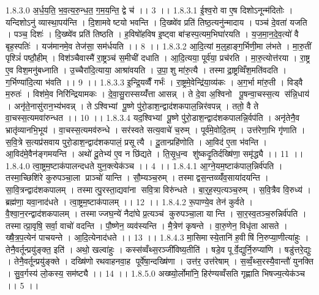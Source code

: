 1.8.3.0
अ॒र्ध॒य॒ति॒ भ॒व॒त्य॒रु॒न्ध॒त॒ ग॒म॒य॒न्ति॒ द्वे च॑ ।। 3 ।।
1.8.3.1
ई॒श्व॒रो वा ए॒ष दिशोऽनून्म॑दितोः । यन्दिशोऽनु॑ व्यास्था॒पय॑न्ति । दि॒शामवेष्टयो भवन्ति । दि॒ख्ष्वे॑व प्रति॑ तिष्ठ॒त्यनु॑न्मादाय । पञ्च॑ दे॒वता॑ यजति । पञ्च॒ दिशः॑ । दि॒ख्ष्वे॑व प्रति॑ तिष्ठति । ह॒विषो॑हविष इ॒ष्ट्वा बा॑ऱ्हस्प॒त्यम॒भिघा॑रयति । य॒ज॒मा॒न॒दे॒व॒त्यो॑ वै बृह॒स्पतिः॑ । यज॑मानमे॒व तेज॑सा॒ सम॑र्धयति ।। 8 ।।
1.8.3.2
आ॒दि॒त्यां म॒ल्॒हाङ्ग॒र्भिणी॒मा ल॑भते । मा॒रु॒तीं पृश्ञिं॑ पष्ठौ॒हीम् । विश॑ञ्चैवास्मै॑ रा॒ष्ट्रञ्च॑ स॒मीची॑ दधाति । आ॒दि॒त्यया॒ पूर्व॑या॒ प्रच॑रति । मा॒रु॒त्योत्त॑रया । रा॒ष्ट्र ए॒व विश॒मनु॑बध्नाति । उ॒च्चैरा॑दि॒त्याया॒ आश्रा॑वयति । उ॒पा॒॒शु मा॑रु॒त्यै । तस्माद्रा॒ष्ट्रव्विँश॒मति॑वदति । ग॒र्भिण्या॑दि॒त्या भ॑वति ।। 9 ।।
1.8.3.3
इ॒न्द्रि॒यव्वैँ गर्भः॑ । रा॒ष्ट्रमे॒वेन्द्रि॑या॒व्य॑कः । अ॒ग॒र्भा मा॑रु॒ती । विड्वै म॒रुतः॑ । विश॑मे॒व निरि॑न्द्रियामकः । दे॒वा॒सु॒रास्सय्यँ॑त्ता आसन्न् । ते दे॒वा अ॒श्विनो पू॒षन्वा॒चस्स॒त्य स॑न्नि॒धाय॑ । अनृ॑ते॒नासु॑रान॒भ्य॑भवन्न् । तेऽश्विभ्यां पू॒ष्णे पु॑रो॒डाश॒न्द्वाद॑शकपाल॒न्निर॑वपन्न् । ततो॒ वै ते वा॒चस्स॒त्यमवा॑रुन्धत ।। 10 ।।
1.8.3.4
यद॒श्विभ्यां पू॒ष्णे पु॑रो॒डाश॒न्द्वाद॑शकपालन्नि॒र्वप॑ति । अनृ॑तेनै॒व भ्रातृ॑व्यानभि॒भूय॑ । वा॒चस्स॒त्यमव॑रुन्धे । सर॑स्वते सत्य॒वाचे॑ च॒रुम् । पूर्व॑मे॒वोदि॒तम् । उत्त॑रेणा॒भि गृ॑णाति । स॒वि॒त्रे स॒त्यप्र॑सवाय पुरो॒डाश॒न्द्वाद॑शकपालं॒ प्रसूत्यै । दू॒तान्प्रहि॑णोति । आ॒विद॑ ए॒ता भ॑वन्ति । आ॒विद॑मे॒वैन॑ङ्गमयन्ति । अथो॑ दू॒तेभ्य॑ ए॒व न छि॑द्यते । ति॒सृ॒ध॒न्व शु॑ष्कदृ॒तिर्दख्षि॑णा॒ समृ॑द्ध्यै ।। 11 ।।
1.8.4.0
त्वा॒ष्ट्रम॒ष्टाक॑पालन्दधते युन॒क्त्येक॑ञ्च ।। 4 ।।
1.8.4.1
आ॒ग्ने॒यम॒ष्टाक॑पाल॒न्निर्व॑पति । तस्मा॒च्छिशि॑रे कुरुपञ्चा॒ला प्राञ्चो॑ यान्ति । सौ॒म्यञ्च॒रुम् । तस्माद्वस॒न्तव्व्यँ॑व॒साया॑दयन्ति । सा॒वि॒त्रन्द्वाद॑शकपालम् । तस्मात्पु॒रस्ता॒द्यवा॑ना सवि॒त्रा विरु॑न्धते । बा॒र्॒ह॒स्प॒त्यञ्च॒रुम् । स॒वि॒त्रैव वि॒रुध्य॑ । ब्रह्म॑णा॒ यवा॒नाद॑धते । त्वा॒ष्ट्रम॒ष्टाक॑पालम् ।। 12 ।।
1.8.4.2
रू॒पाण्ये॒व तेन॑ कुर्वते । वै॒श्वा॒न॒रन्द्वाद॑शकपालम् । तस्माज्जघ॒न्ये॑ नैदा॑घे प्र॒त्यञ्च॑ कुरुपञ्चा॒ला यान्ति । सा॒र॒स्व॒तञ्च॒रुन्निर्व॑पति । तस्मात्प्रा॒वृषि॒ सर्वा॒ वाचो॑ वदन्ति । पौ॒ष्णेन॒ व्यव॑स्यन्ति । मै॒त्रेण॑ कृषन्ते । वा॒रु॒णेन॒ विधृ॑ता आसते । ख्षै॒त्र॒प॒त्येन॑ पाचयन्ते । आ॒दि॒त्येनाद॑धते ।। 13 ।।
1.8.4.3
मा॒सिमास्ये॒तानि॑ ह॒वीषि॑ नि॒रुप्या॒णीत्या॑हुः । तेनै॒वर्तून्प्रयु॑ङ्क्त॒ इति॑ । अथो॒ खल्वा॑हुः । कस्स॑व्वँथ्स॒रञ्जी॑विष्य॒तीति॑ । षडे॒व पूर्वे॒द्युर्नि॒रुप्या॑णि । षडु॑त्तरे॒द्युः । तेनै॒वर्तून्प्रयु॑ङ्क्ते । दख्षि॑णो रथवाहनवा॒ह पूर्वे॑षा॒न्दख्षि॑णा । उत्त॑र॒ उत्त॑रेषाम् । स॒व्वँ॒थ्स॒रस्यै॒वान्तौ॑ युनक्ति । सु॒व॒र्गस्य॑ लो॒कस्य॒ सम॑ष्ट्यै ।। 14 ।।
1.8.5.0
अख्ष्यो॒र्लोमा॑नि॒ हिर॑ण्यव्वँसति गृह्णाति भिषज्य॒त्येक॑ञ्च ।। 5 ।।
